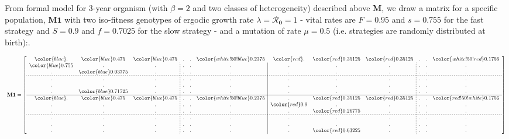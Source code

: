 \documentclass[10pt,a4paper]{article}
\begin{document}

From formal model for 3-year organism (with $\beta=2$ and two classes of heterogeneity) described above $\mathbf{M}$, we draw a matrix for a specific population, $\mathbf{M1}$ with two iso-fitness genotypes of ergodic growth rate $\lambda=\boldsymbol{\mathcal{R}_{0}}=1$ - vital rates are $F=0.95$ and $s=0.755$ for the fast strategy and $S=0.9$ and $f=0.7025$ for the slow strategy - and a mutation of rate $\mu=0.5$ (i.e. strategies are randomly distributed at birth):.

\[
\resizebox{!}{22mm}{
$\displaystyle 
\mathbf{M1}=\left[\begin{array}
{c c c;{2pt/2pt} c c c | c c c ;{2pt/2pt}c c c}
 \color{blue} . & \color{blue}0.475& \color{blue}0.475 & . & . & \color{white!50!blue}0.2375 &  \color{red} . & \color{red}0.35125 & \color{red}0.35125 & . & . & \color{white!50!red}0.1756   \\
\color{blue} 0.755  & . & . & . & . & . & .  & . & . & . & . & . \\
.  & \color{blue} 0.03775 & . & . & . & . &.  & . & . & . & . & . \\
\hdashline[2pt/2pt]
.  & . & . & .  & . & . & .  & . & . &  .  & . & .  \\
.  & . & . & .  & . & . & .  & . & . &  .  & . & .  \\
.  & \color{blue}0.71725 & . & .  & . & . & .  & . & . &  .  & . & . \\    
\hline
\color{blue}. & \color{blue}0.475 & \color{blue}0.475 & . & . & \color{white!50!blue}0.2375   &. & \color{red}0.35125 & \color{red}0.35125 & . & . & \color{red!50!white}0.1756 \\
.  & . & . & .  & . & . & \color{red} 0.9  & .  & . & . & . & . \\
.  & . & . & .  & . & . & .  & \color{red}0.26775 & . &. & . & . \\
\hdashline[2pt/2pt]
.  & . & . & .  & . & . & .  & . & . &  .  & . & .  \\
.  & . & . & .  & . & . & .  & . & . &  .  & . & .  \\
.  & . & . & . & . & . & .  & \color{red} 0.63225 & . & . & . & . 
\end{array}\right]
$
}
\]\\
\end{document}
